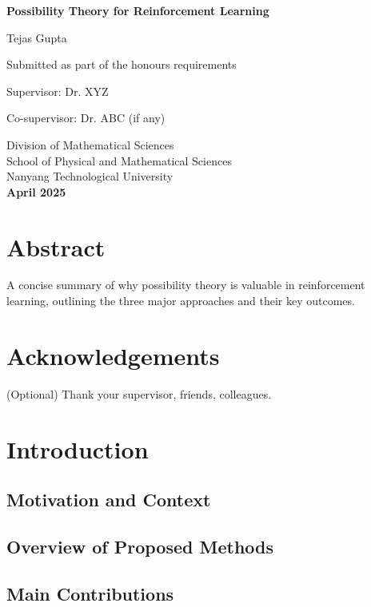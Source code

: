\documentclass[11pt,a4paper]{report}
\begin{document}
\begin{titlepage}
    \centering
    \vspace*{3cm}
    {\Huge\bfseries Possibility Theory for Reinforcement Learning \par}
    \vspace{2cm}
    {\Large Tejas Gupta \par}
    \vspace{1.5cm}
    Submitted as part of the honours requirements \par
    \vspace{1cm}
    Supervisor: Dr. XYZ \par
    Co-supervisor: Dr. ABC (if any) \par
    \vfill
    Division of Mathematical Sciences \\
    School of Physical and Mathematical Sciences \\
    Nanyang Technological University \\
    \vspace{1cm}
    \textbf{April 2025}
\end{titlepage}

\chapter*{Abstract}
A concise summary of why possibility theory is valuable in reinforcement learning, outlining the three major approaches and their key outcomes.

\chapter*{Acknowledgements}
(Optional) Thank your supervisor, friends, colleagues.

\tableofcontents

\chapter{Introduction}
\section{Motivation and Context}
\section{Overview of Proposed Methods}
\section{Main Contributions}
\end{document}
